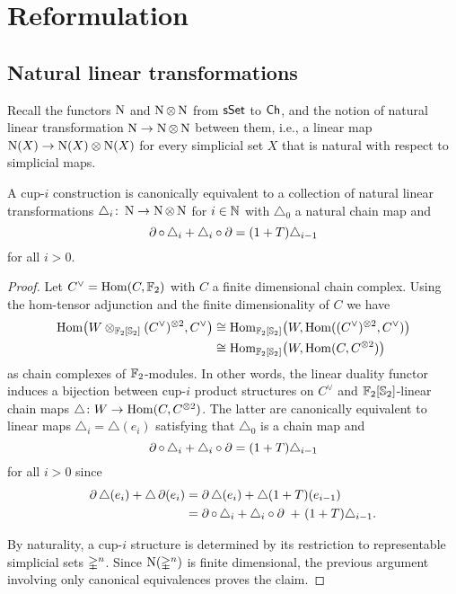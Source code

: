 
\section{Reformulation} \label{s:reformulation}

\subsection{Natural linear transformations}

Recall the functors $\operatorname{N}$ and $\operatorname{N} \otimes \operatorname{N}$ from $\mathsf{sSet}$ to $\mathsf{Ch}$, and the notion of natural linear transformation $\operatorname{N} \to \operatorname{N} \otimes \operatorname{N}$ between them, i.e., a linear map $\operatorname{N}(X) \to \operatorname{N}(X) \otimes \operatorname{N}(X)$ for every simplicial set $X$ that is natural with respect to simplicial maps.

\begin{lemma} \label{l:cup-i construction coalgebra}
	A cup-$i$ construction is canonically equivalent to a collection of natural linear transformations $\triangle_i \colon \operatorname{N} \to \operatorname{N} \otimes \operatorname{N}$ for $i \in \mathbb{N}$ with $\triangle_0$ a natural chain map and
	\[
	\operatorname{\partial} \circ \, \triangle_i + \triangle_i \circ \operatorname{\partial} =
	(1+T) \triangle_{i-1}
	\]
	for all $i > 0$.
\end{lemma}

\begin{proof}
	Let $C^\vee = \mathrm{Hom}(C, {\mathbb{F}_2})$ with $C$ a finite dimensional chain complex.
	Using the hom-tensor adjunction and the finite dimensionality of $C$ we have
	\begin{align*}
	\mathrm{Hom} \big(W \otimes_{{\mathbb{F}_2}[\mathbb{S}_2]} (C^\vee)^{\otimes 2}, C^\vee \big) & \cong
	\mathrm{Hom}_{{\mathbb{F}_2}[\mathbb{S}_2]} \big( W, \mathrm{Hom}((C^\vee)^{\otimes 2}, C^\vee) \big) \\ & \cong
	\mathrm{Hom}_{{\mathbb{F}_2}[\mathbb{S}_2]} \big( W, \mathrm{Hom}(C, C^{\otimes 2}) \big)
	\end{align*}
	as chain complexes of ${\mathbb{F}_2}$-modules.
	In other words, the linear duality functor induces a bijection between cup-$i$ product structures on $C^\vee$ and ${\mathbb{F}_2}[\mathbb{S}_2]$-linear chain maps $\triangle \colon W \to \mathrm{Hom}(C, C^{\otimes 2})$.
	The latter are canonically equivalent to linear maps $\triangle_i = \triangle(e_i)$ satisfying that $\triangle_0$ is a chain map and
	\[
	\operatorname{\partial} \circ \, \triangle_i + \triangle_i \circ \operatorname{\partial} =
	(1+T) \triangle_{i-1}
	\]
	for all $i > 0$ since
	\begin{align*}
	\operatorname{\partial} \triangle (e_i) + \triangle \operatorname{\partial}(e_i) &=
	\operatorname{\partial} \triangle (e_i) + \triangle (1+T) (e_{i-1}) \\ &=
	\operatorname{\partial} \circ \, \triangle_i + \triangle_i \circ \operatorname{\partial} \ +\ (1+T) \triangle_{i-1}.
	\end{align*}

	By naturality, a cup-$i$ structure is determined by its restriction to representable simplicial sets $\mathbb{\Delta}^n$.
	Since $\operatorname{N}(\mathbb{\Delta}^n)$ is finite dimensional, the previous argument involving only canonical equivalences proves the claim.
\end{proof}

